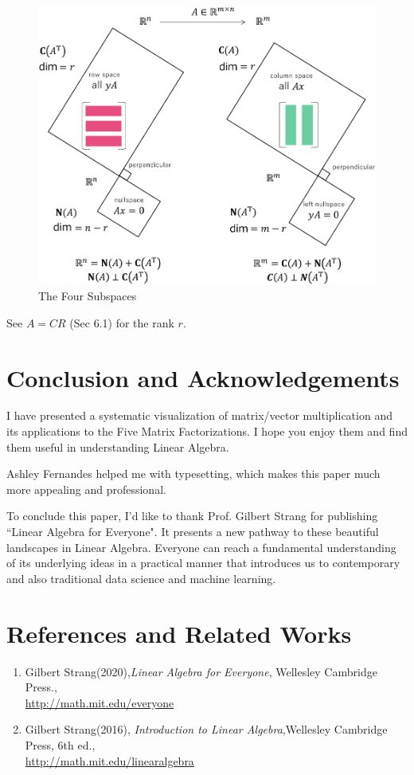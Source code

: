 \documentclass{article}
\begin{document}
\begin{figure}[H]
  \centering
  \includegraphics[scale=0.8]{../figz/4-Subspaces}
  \caption{The Four Subspaces}
\end{figure}

See $A=CR$ (Sec 6.1) for the rank $r$.

\section{Conclusion and Acknowledgements}

I have presented a systematic visualization of matrix/vector multiplication and
its applications to the Five Matrix Factorizations. I hope you
enjoy them and find them useful
in understanding Linear Algebra.

Ashley Fernandes helped me with typesetting, which
makes this paper much more appealing and professional.

To conclude this paper, I'd like to thank Prof. Gilbert Strang for
publishing ``Linear Algebra for Everyone". It presents a new pathway to these beautiful landscapes in Linear Algebra.
Everyone can reach a fundamental understanding of its underlying ideas
in a practical manner that introduces us to contemporary and also
traditional data science and machine learning.

\section*{References and Related Works}
\begin{enumerate}
  \item
  Gilbert Strang(2020),\emph{Linear Algebra for Everyone}, Wellesley Cambridge Press.,\\
  \url{http://math.mit.edu/everyone}
  \item
  Gilbert Strang(2016), \emph{Introduction to Linear Algebra},Wellesley Cambridge Press, 6th ed.,\\
  \url{http://math.mit.edu/linearalgebra}
\end{enumerate}
\end{document}

